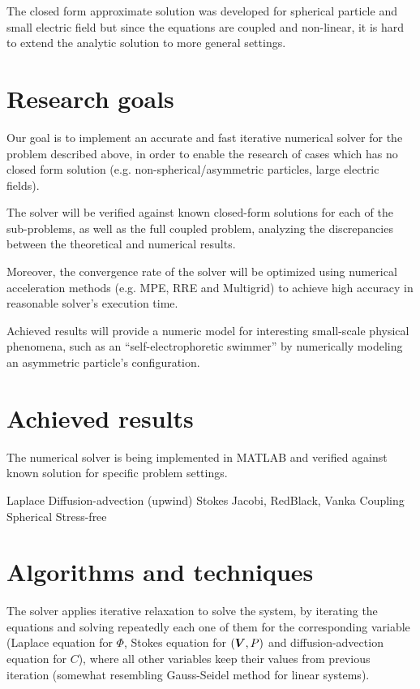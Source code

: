\documentclass[11pt]{article}
\begin{document}
The closed form approximate solution was developed for spherical particle
and small electric field \cite{Yariv10} but since the equations are coupled
and non-linear, it is hard to extend the analytic solution to more general
settings.

\section{Research goals}
Our goal is to implement an accurate and fast iterative numerical 
solver for the problem described above,
in order to enable the research of cases which has no closed form solution 
(e.g. non-spherical/asymmetric particles, large electric fields).

The solver will be verified against known closed-form solutions 
for each of the sub-problems, as well as the full coupled problem, 
analyzing the discrepancies between the theoretical and numerical results.

Moreover, the convergence rate of the solver will be optimized using 
numerical acceleration methods (e.g. MPE, RRE and Multigrid) to achieve
high accuracy in reasonable solver's execution time.

Achieved results will provide a numeric model for interesting small-scale physical phenomena,
such as an ``self-electrophoretic swimmer'' by numerically modeling an asymmetric particle's configuration.

\section{Achieved results}
The numerical solver is being implemented in MATLAB and verified against
known solution for specific problem settings.

Laplace
Diffusion-advection (upwind)
Stokes
Jacobi, RedBlack, Vanka
Coupling
Spherical
Stress-free




\section{Algorithms and techniques}

The solver applies iterative relaxation to solve the system, by
iterating the equations and solving repeatedly each one of them
for the corresponding variable
(Laplace equation for $\varPhi$, Stokes equation for $(\boldsymbol{V}, P)$
and diffusion-advection equation for $C$), where
all other variables keep their values from previous iteration
(somewhat resembling Gauss-Seidel method for linear systems).
\end{document}
